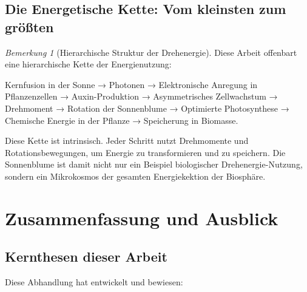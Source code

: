 \documentclass[12pt,a4paper]{report}
\theoremstyle{plain}
\theoremstyle{definition}
\theoremstyle{remark}
\newtheorem{bemerkung}[theorem]{Bemerkung}
\begin{document}
\section{Die Energetische Kette: Vom kleinsten zum größten}

\begin{bemerkung}[Hierarchische Struktur der Drehenergie]
	Diese Arbeit offenbart eine hierarchische Kette der Energienutzung:
	
	Kernfusion in der Sonne → Photonen → Elektronische Anregung in Pflanzenzellen → Auxin-Produktion → Asymmetrisches Zellwachstum → Drehmoment → Rotation der Sonnenblume → Optimierte Photosynthese → Chemische Energie in der Pflanze → Speicherung in Biomasse.
	
	Diese Kette ist intrinsisch. Jeder Schritt nutzt Drehmomente und Rotationsbewegungen, um Energie zu transformieren und zu speichern. Die Sonnenblume ist damit nicht nur ein Beispiel biologischer Drehenergie-Nutzung, sondern ein Mikrokosmos der gesamten Energiekektion der Biosphäre.
\end{bemerkung}

\chapter{Zusammenfassung und Ausblick}

\section{Kernthesen dieser Arbeit}

Diese Abhandlung hat entwickelt und bewiesen:
\end{document}
